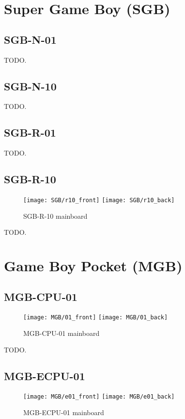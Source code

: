 \section{Super Game Boy (SGB)}

\subsection{SGB-N-01}

TODO.

\subsection{SGB-N-10}

TODO.

\subsection{SGB-R-01}

TODO.

\subsection{SGB-R-10}

\begin{figure}[H]
  \centering
  \texttt{[image: SGB/r10\_front]}
  \texttt{[image: SGB/r10\_back]}
  \caption{SGB-R-10 mainboard}
\end{figure}

TODO.

\section{Game Boy Pocket (MGB)}

\subsection{MGB-CPU-01}

\begin{figure}[H]
  \centering
  \texttt{[image: MGB/01\_front]}
  \texttt{[image: MGB/01\_back]}
  \caption{MGB-CPU-01 mainboard}
\end{figure}

TODO.

\subsection{MGB-ECPU-01}

\begin{figure}[H]
  \centering
  \texttt{[image: MGB/e01\_front]}
  \texttt{[image: MGB/e01\_back]}
  \caption{MGB-ECPU-01 mainboard}
\end{figure}

